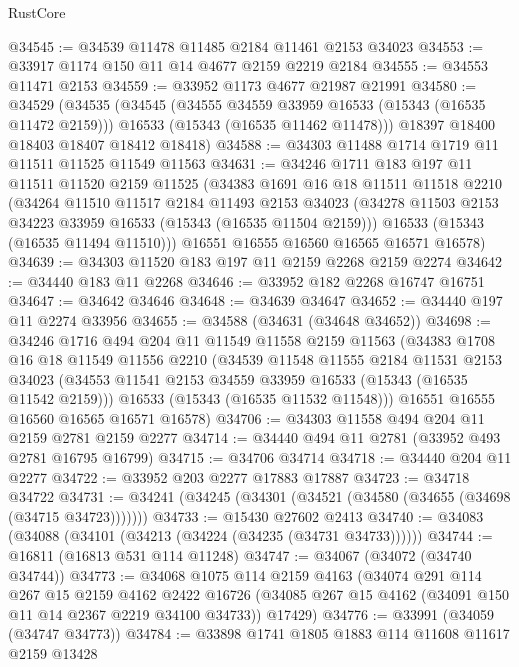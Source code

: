 \begin{lexlean}{RustCore}
\begin{coremodule}
@34545 := @34539 @11478 @11485 @2184 @11461 @2153 @34023
@34553 := @33917 @1174 @150 @11 @14 @4677 @2159 @2219 @2184
@34555 := @34553 @11471 @2153
@34559 := @33952 @1173 @4677 @21987 @21991
@34580 := @34529
    (@34535
      (@34545
        (@34555 @34559 @33959 @16533 (@15343 (@16535 @11472 @2159)))
        @16533
        (@15343 (@16535 @11462 @11478)))
      @18397
      @18400
      @18403
      @18407
      @18412
      @18418)
@34588 := @34303 @11488 @1714 @1719 @11 @11511 @11525 @11549 @11563
@34631 := @34246
    @1711
    @183
    @197
    @11
    @11511
    @11520
    @2159
    @11525
    (@34383
      @1691
      @16
      @18
      @11511
      @11518
      @2210
      (@34264
        @11510
        @11517
        @2184
        @11493
        @2153
        @34023
        (@34278 @11503 @2153 @34223 @33959 @16533 (@15343 (@16535 @11504 @2159)))
        @16533
        (@15343 (@16535 @11494 @11510)))
      @16551
      @16555
      @16560
      @16565
      @16571
      @16578)
@34639 := @34303 @11520 @183 @197 @11 @2159 @2268 @2159 @2274
@34642 := @34440 @183 @11 @2268
@34646 := @33952 @182 @2268 @16747 @16751
@34647 := @34642 @34646
@34648 := @34639 @34647
@34652 := @34440 @197 @11 @2274 @33956
@34655 := @34588 (@34631 (@34648 @34652))
@34698 := @34246
    @1716
    @494
    @204
    @11
    @11549
    @11558
    @2159
    @11563
    (@34383
      @1708
      @16
      @18
      @11549
      @11556
      @2210
      (@34539
        @11548
        @11555
        @2184
        @11531
        @2153
        @34023
        (@34553 @11541 @2153 @34559 @33959 @16533 (@15343 (@16535 @11542 @2159)))
        @16533
        (@15343 (@16535 @11532 @11548)))
      @16551
      @16555
      @16560
      @16565
      @16571
      @16578)
@34706 := @34303 @11558 @494 @204 @11 @2159 @2781 @2159 @2277
@34714 := @34440 @494 @11 @2781 (@33952 @493 @2781 @16795 @16799)
@34715 := @34706 @34714
@34718 := @34440 @204 @11 @2277
@34722 := @33952 @203 @2277 @17883 @17887
@34723 := @34718 @34722
@34731 := @34241 (@34245 (@34301 (@34521 (@34580 (@34655 (@34698 (@34715 @34723)))))))
@34733 := @15430 @27602 @2413
@34740 := @34083 (@34088 (@34101 (@34213 (@34224 (@34235 (@34731 @34733))))))
@34744 := @16811 (@16813 @531 @114 @11248)
@34747 := @34067 (@34072 (@34740 @34744))
@34773 := @34068
    @1075
    @114
    @2159
    @4163
    (@34074
      @291
      @114
      @267
      @15
      @2159
      @4162
      @2422
      @16726
      (@34085 @267 @15 @4162 (@34091 @150 @11 @14 @2367 @2219 @34100 @34733))
      @17429)
@34776 := @33991 (@34059 (@34747 @34773))
@34784 := @33898 @1741 @1805 @1883 @114 @11608 @11617 @2159 @13428

\end{coremodule}
\end{lexlean}
